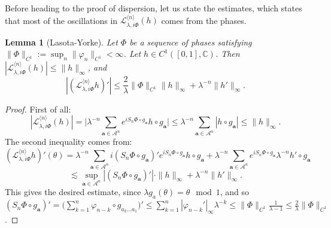 \documentclass[11pt]{amsart}
\renewcommand{\phi}{\varphi}
\theoremstyle{plain}
\newtheorem{lemma}[theorem]{Lemma}
\theoremstyle{definition}
\numberwithin{equation}{section}
\begin{document}

Before heading to the proof of dispersion, let us state the  estimates, which states that most of the oscillations in $\mathcal{L}_{\lambda,i\Phi}^{\langle n \rangle}(h)$ comes from the phases.

\begin{lemma}[Lasota-Yorke]
Let $\Phi$ be a sequence of phases satisfying $\|\Phi\|_{C^1} := \sup_n \|\phi_n\|_{C^1} < \infty$. Let $h \in C^{1}([0,1],\mathbb{C})$. Then $ |\mathcal{L}_{\lambda,i\Phi}^{\langle n \rangle}(h)| \leq \|h\|_\infty $, and $$ |(\mathcal{L}_{\lambda,i\Phi}^{\langle n \rangle} h)'| \leq \frac{2}{\lambda} \|\Phi\|_{C^1} \|h\|_\infty + \lambda^{-n} \|h'\|_\infty. $$
\end{lemma}

\begin{proof}
First of all:
$$ |\mathcal{L}_{\lambda,i\Phi}^{\langle n \rangle}(h)| = \Big|\lambda^{-n} \sum_{\mathbf{a} \in \mathcal{A}^{n}} e^{i S_n \Phi \circ g_\mathbf{a}} h \circ g_\mathbf{a} \Big| \leq \lambda^{-n} \sum_{\mathbf{a} \in \mathcal{A}^{n}} |h\circ g_\mathbf{a}| \leq \|h\|_\infty. $$
The second inequality comes from:
$$ (\mathcal{L}_{\lambda,i\Phi}^{\langle n \rangle} h)'(\theta) = \lambda^{-n} \sum_{\mathbf{a} \in \mathcal{A}^{n}} i (S_n \Phi \circ g_\mathbf{a})' e^{i S_n \Phi \circ g_\mathbf{a}} h \circ g_\mathbf{a} + \lambda^{-n} \sum_{\mathbf{a} \in \mathcal{A}^{n}} e^{i S_n \Phi \circ g_\mathbf{a}} \lambda^{-n} h' \circ g_\mathbf{a}  $$
$$ \lesssim \sup_{\mathbf{a} \in \mathcal{A}^n} |(S_n \Phi \circ g_\mathbf{a})'| \cdot \|h\|_\infty + \lambda^{-n} \|h'\|_\infty. $$
This gives the desired estimate, since $\lambda g_a(\theta) = \theta \mod 1$, and so
$(S_n \Phi \circ g_\mathbf{a})' = \Big(\sum_{k=1}^{n} \phi_{n-k} \circ g_{a_{k} \dots a_1}\Big)' \leq \sum_{k=1}^{n} |\phi_{n-k}'|_\infty \lambda^{-k} \leq \|\Phi\|_{C^1} \frac{1}{\lambda-1} \leq \frac{2}{\lambda} \|\Phi\|_{C^1}$. 
\end{proof}
\end{document}
